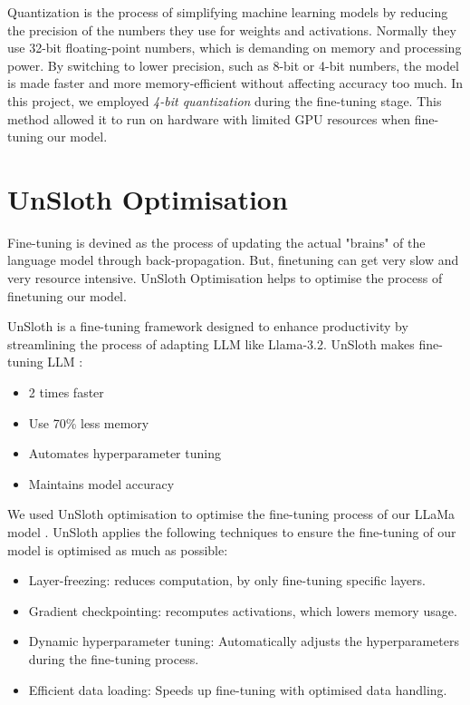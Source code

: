 \documentclass[10pt]{article}
\begin{document}
Quantization is the process of simplifying machine learning models by reducing the
precision of the numbers they use for weights and activations. Normally they use 32-bit
floating-point numbers, which is demanding on memory and processing power. By switching to
lower precision, such as 8-bit or 4-bit numbers, the model is made faster and more
memory-efficient without affecting accuracy too much. In this project, we employed
\textit{4-bit quantization} during the fine-tuning stage. This method allowed it to
run on hardware with limited GPU resources when fine-tuning our model.

\section{UnSloth Optimisation}

Fine-tuning is devined as the process of updating the actual "brains" of the language model
through back-propagation. But, finetuning can get very slow and very resource intensive.
UnSloth Optimisation helps to optimise the process of finetuning our model.

UnSloth is a fine-tuning framework designed to enhance productivity by streamlining the
process of adapting LLM like Llama-3.2. UnSloth makes fine-tuning
LLM \cite{unslothdocs}:
\begin{itemize}
    \item 2 times faster
    \item Use 70\% less memory
    \item Automates hyperparameter tuning
    \item Maintains model accuracy
\end{itemize}

We used UnSloth optimisation to optimise the fine-tuning process of our LLaMa model \cite{unslothfine-tune}.
UnSloth applies the following techniques to ensure the fine-tuning
of our model is optimised as much as possible:
\begin{itemize}
    \item Layer-freezing: reduces computation, by only fine-tuning specific layers.
    \item Gradient checkpointing: recomputes activations, which lowers memory usage.
    \item Dynamic hyperparameter tuning: Automatically adjusts the hyperparameters during the fine-tuning process.
    \item Efficient data loading: Speeds up fine-tuning with optimised data handling.
\end{itemize}
\end{document}
